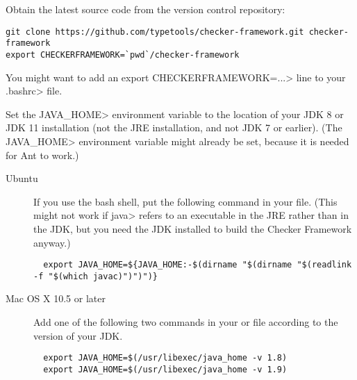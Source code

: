 
Obtain the latest source code from the version control repository:

\begin{Verbatim}
git clone https://github.com/typetools/checker-framework.git checker-framework
export CHECKERFRAMEWORK=`pwd`/checker-framework
\end{Verbatim}

You might want to add an \<export CHECKERFRAMEWORK=...> line to your
\<.bashrc> file.

Set the \<JAVA\_HOME> environment variable to the location of your JDK
8 or JDK 11 installation (not the JRE installation, and not JDK 7 or earlier).
(The \<JAVA\_HOME> environment
variable might already be set, because it is needed for Ant to work.)

\begin{description}
\item[Ubuntu]
If you use the bash shell, put the following command in your
 file.  (This might not work if \<java> refers to an executable
in the JRE rather than in the JDK, but you need the JDK installed to build
the Checker Framework anyway.)
\begin{smaller}
\begin{Verbatim}
  export JAVA_HOME=${JAVA_HOME:-$(dirname "$(dirname "$(readlink -f "$(which javac)")")")}
\end{Verbatim}
\end{smaller}

\item[Mac OS X 10.5 or later]
  Add one of the following two commands in your  or
   file according to the version of your JDK.
\begin{Verbatim}
  export JAVA_HOME=$(/usr/libexec/java_home -v 1.8)
  export JAVA_HOME=$(/usr/libexec/java_home -v 1.9)
\end{Verbatim}

\end{description}

